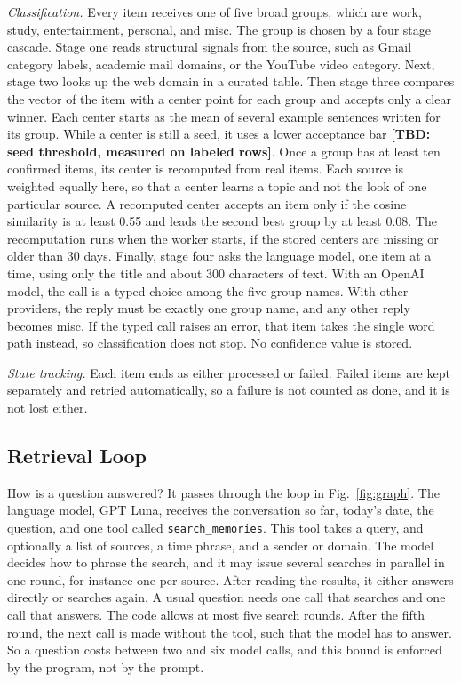 \documentclass[conference]{IEEEtran}
\newcommand{\llmname}{GPT\nobreakdash-5.6 Luna}
\newcommand{\tbd}[1]{\textbf{[TBD: #1]}}
\begin{document}
\textit{Classification.} Every item receives one of five broad groups, which are work, study, entertainment, personal, and misc. The group is chosen by a four stage cascade. Stage one reads structural signals from the source, such as Gmail category labels, academic mail domains, or the YouTube video category. Next, stage two looks up the web domain in a curated table. Then stage three compares the vector of the item with a center point for each group and accepts only a clear winner. Each center starts as the mean of several example sentences written for its group. While a center is still a seed, it uses a lower acceptance bar \tbd{seed threshold, measured on labeled rows}. Once a group has at least ten confirmed items, its center is recomputed from real items. Each source is weighted equally here, so that a center learns a topic and not the look of one particular source. A recomputed center accepts an item only if the cosine similarity is at least 0.55 and leads the second best group by at least 0.08. The recomputation runs when the worker starts, if the stored centers are missing or older than 30 days. Finally, stage four asks the language model, one item at a time, using only the title and about 300 characters of text. With an OpenAI model, the call is a typed choice among the five group names. With other providers, the reply must be exactly one group name, and any other reply becomes misc. If the typed call raises an error, that item takes the single word path instead, so classification does not stop. No confidence value is stored.

\textit{State tracking.} Each item ends as either processed or failed. Failed items are kept separately and retried automatically, so a failure is not counted as done, and it is not lost either.

\subsection{Retrieval Loop}
How is a question answered? It passes through the loop in Fig.~\ref{fig:graph}. The language model, \llmname{}, receives the conversation so far, today's date, the question, and one tool called \texttt{search\_memories}. This tool takes a query, and optionally a list of sources, a time phrase, and a sender or domain. The model decides how to phrase the search, and it may issue several searches in parallel in one round, for instance one per source. After reading the results, it either answers directly or searches again. A usual question needs one call that searches and one call that answers. The code allows at most five search rounds. After the fifth round, the next call is made without the tool, such that the model has to answer. So a question costs between two and six model calls, and this bound is enforced by the program, not by the prompt.
\end{document}
